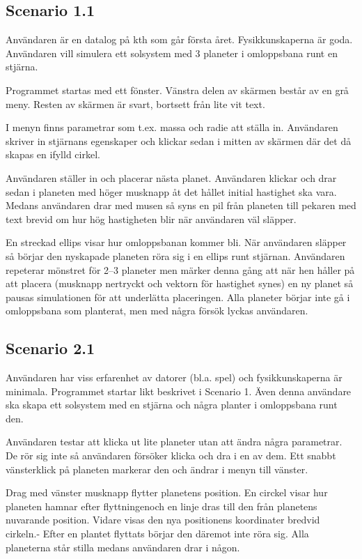 \subsection{Scenario 1.1}

Användaren är en datalog på kth som går första året.
Fysikkunskaperna är goda.
Användaren vill simulera ett solsystem med 3 planeter
i omloppsbana runt en stjärna.

Programmet startas med ett fönster.
Vänstra delen av skärmen består av en grå meny.
Resten av skärmen är svart, bortsett
från lite vit text.

I menyn finns parametrar som t.ex. massa och radie att ställa in.
Användaren skriver in stjärnans egenskaper och klickar
sedan i mitten av skärmen där det då skapas en ifylld cirkel.

Användaren ställer in och placerar nästa planet.
Användaren klickar och drar sedan i planeten med
höger musknapp åt det hållet initial hastighet ska vara.
Medans användaren drar med musen så syns en pil från planeten till
pekaren med text brevid om hur hög hastigheten blir när användaren väl släpper.

En streckad ellips visar hur omloppsbanan kommer bli.
När användaren släpper så börjar den nyskapade planeten röra sig
i en ellips runt stjärnan.
Användaren repeterar mönstret för 2--3 planeter men märker denna gång
att när hen håller på att placera (musknapp nertryckt och vektorn
för hastighet synes) en ny planet så pausas simulationen för att
underlätta placeringen.
Alla planeter börjar inte gå i omloppsbana som planterat,
men med några försök lyckas användaren.

\subsection{Scenario 2.1}

Användaren har viss erfarenhet av datorer (bl.a. spel) och
fysikkunskaperna är minimala.
Programmet startar likt beskrivet i Scenario 1.
Även denna användare ska skapa ett solsystem med en stjärna
och några planter i omloppsbana runt den.

Användaren testar att klicka ut lite planeter utan att ändra några parametrar.
De rör sig inte så användaren försöker klicka och dra i en av dem.
Ett snabbt vänsterklick på planeten markerar den och ändrar i menyn
till vänster.

Drag med vänster musknapp flytter planetens position.
En circkel visar hur planeten hamnar efter flyttningenoch en linje dras
till den från planetens nuvarande position.
Vidare visas den nya positionens koordinater bredvid cirkeln.-
Efter en plantet flyttats börjar den däremot inte röra sig.
Alla planeterna står stilla medans användaren drar i någon.

